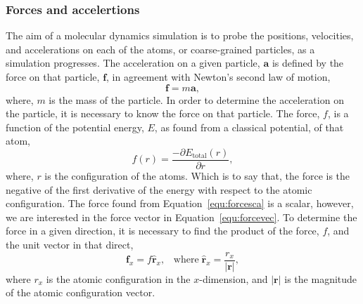 \subsubsection{Forces and accelertions}
The aim of a molecular dynamics simulation is to probe the positions, velocities, and accelerations on each of the atoms, or coarse-grained particles, as a simulation progresses.
The acceleration on a given particle, $\mathbf{a}$ is defined by the force on that particle, $\mathbf{f}$, in agreement with Newton's second law of motion,
%
\begin{equation}
\mathbf{f} = m\mathbf{a},
\label{equ:forcevec}
\end{equation}
%
where, $m$ is the mass of the particle.
In order to determine the acceleration on the particle, it is necessary to know the force on that particle.
The force, $f$, is a function of the potential energy, $E$, as found from a classical potential, of that atom,
%
\begin{equation}
f(r) = \frac{-\partial E_{\text{total}}(r)}{\partial r},
\label{equ:forcesca}
\end{equation}
%
where, $r$ is the configuration of the atoms.
Which is to say that, the force is the negative of the first derivative of the energy with respect to the atomic configuration.
The force found from Equation~\ref{equ:forcesca} is a scalar, however, we are interested in the force vector in Equation~\ref{equ:forcevec}.
To determine the force in a given direction, it is necessary to find the product of the force, $f$, and the unit vector in that direct,
%
\begin{equation}
\mathbf{f}_x = f\hat{\mathbf{r}}_x, \;\;\;\text{where}\;\hat{\mathbf{r}}_x = \frac{r_x}{|\mathbf{r}|},
\end{equation}
%
where $r_x$ is the atomic configuration in the $x$-dimension, and $|\mathbf{r}|$ is the magnitude of the atomic configuration vector.

